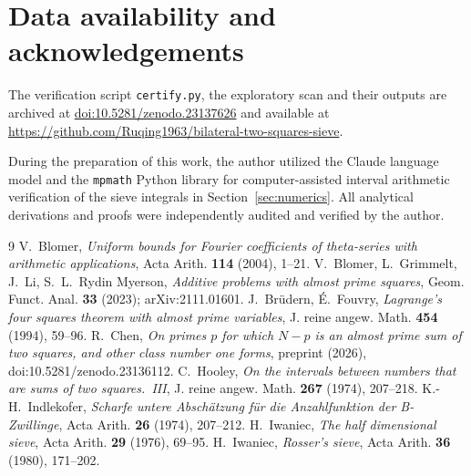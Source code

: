 \documentclass[11pt]{amsart}
\theoremstyle{remark}
\begin{document}
\section*{Data availability and acknowledgements}
The verification script \texttt{certify.py}, the exploratory scan and their outputs are archived at
\href{https://doi.org/10.5281/zenodo.23137626}{doi:10.5281/zenodo.23137626} and available at\\
\url{https://github.com/Ruqing1963/bilateral-two-squares-sieve}.

\indent During the preparation of this work, the author utilized the Claude language model and the
\texttt{mpmath} Python library for computer-assisted interval arithmetic verification of the sieve
integrals in Section~\ref{sec:numerics}. All analytical derivations and proofs were independently audited
and verified by the author.

\begin{thebibliography}{9}
 V.~Blomer, \emph{Uniform bounds for Fourier coefficients of theta-series with arithmetic
applications}, Acta Arith. \textbf{114} (2004), 1--21.
 V.~Blomer, L.~Grimmelt, J.~Li, S.~L.~Rydin Myerson, \emph{Additive problems with almost prime
squares}, Geom. Funct. Anal. \textbf{33} (2023); arXiv:2111.01601.
 J.~Br\"udern, \'E.~Fouvry, \emph{Lagrange's four squares theorem with almost prime variables},
J. reine angew. Math. \textbf{454} (1994), 59--96.
 R.~Chen, \emph{On primes $p$ for which $N-p$ is an almost prime sum of two squares, and other
class number one forms}, preprint (2026), doi:10.5281/zenodo.23136112.
 C.~Hooley, \emph{On the intervals between numbers that are sums of two squares.\ III},
J. reine angew. Math. \textbf{267} (1974), 207--218.
 K.-H.~Indlekofer, \emph{Scharfe untere Absch\"atzung f\"ur die Anzahlfunktion der
B-Zwillinge}, Acta Arith. \textbf{26} (1974), 207--212.
 H.~Iwaniec, \emph{The half dimensional sieve}, Acta Arith. \textbf{29} (1976), 69--95.
 H.~Iwaniec, \emph{Rosser's sieve}, Acta Arith. \textbf{36} (1980), 171--202.
\end{thebibliography}
\end{document}

